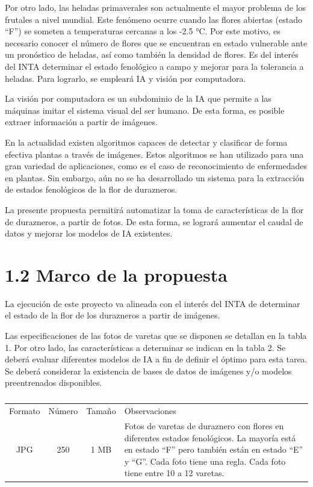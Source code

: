 \documentclass[
11pt, %
]{charter}
\begin{document}
Por otro lado, las heladas primaverales son actualmente el mayor problema de los frutales a nivel mundial. Este fenómeno ocurre cuando las flores abiertas (estado “F”) se someten a temperaturas cercanas a los -2.5 °C. Por este motivo, es necesario conocer el número de flores que se encuentran en estado vulnerable ante un pronóstico de heladas, así como también la densidad de flores. Es del interés del INTA determinar el estado fenológico a campo y mejorar para la tolerancia a heladas. Para lograrlo, se empleará IA y visión por computadora.

La visión por computadora es un subdominio de la IA que permite a las máquinas imitar el sistema visual del ser humano. De esta forma, es posible extraer información a partir de imágenes. 

En la actualidad existen algoritmos capaces de detectar y clasificar de forma efectiva plantas a través de imágenes. Estos algoritmos se han utilizado para una gran variedad de aplicaciones, como es el caso de reconocimiento de enfermedades en plantas. Sin embargo, aún no se ha desarrollado un sistema para la extracción de estados fenológicos de la flor de durazneros.

La presente propuesta permitirá automatizar la toma de características de la flor de durazneros, a partir de fotos. De esta forma, se logrará aumentar el caudal de datos y mejorar los modelos de IA existentes.

\section{1.2 Marco de la propuesta}
\label{sec:descripcion}

La ejecución de este proyecto va alineada con el interés del INTA de determinar el estado de la flor de los durazneros a partir de imágenes.

Las especificaciones de las fotos de varetas que se disponen se detallan en la tabla 1. Por otro lado, las características a determinar se indican en la tabla 2. Se deberá evaluar diferentes modelos de IA a fin de definir el óptimo para esta tarea. Se deberá considerar la existencia de bases de datos de imágenes y/o modelos preentrenados disponibles.

\renewcommand{\tablename}{Tabla}
\begin{table}[ht]
\begin{center}
\begin{tabularx}{\textwidth}{| c | c | c | X | }
\hline
\rowcolor[HTML]{C0C0C0}
\multicolumn{4}{ |c| }{Características de las fotos de duraznos} \\ \hline
Formato & Número & Tamaño & Observaciones \\ \hline
JPG     & 250    & 1 MB   & Fotos de varetas de duraznero con flores en           diferentes estados fenológicos. La mayoría está en estado “F” pero también están en estado “E” y “G”. Cada foto tiene una regla. Cada foto tiene entre 10 a 12 varetas. \\ \hline
\end{tabularx}
\caption{}
\label{tab:coches}
\end{center}
\end{table}
\end{document}
